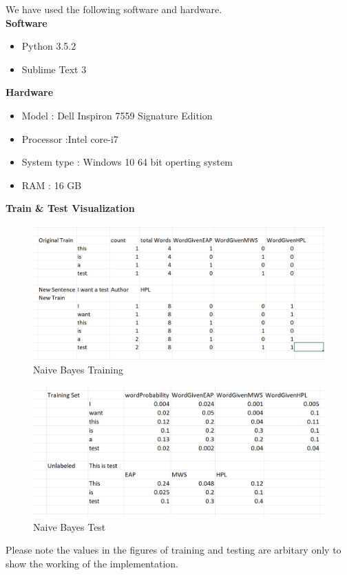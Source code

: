 \documentclass[fleqn,10pt]{SelfArx} %
\begin{document}
We have used the following software and hardware.\\
\textbf{Software}
\begin{itemize}[noitemsep]
	\item Python 3.5.2
	\item Sublime Text 3
\end{itemize}
\textbf{Hardware}
\begin{itemize}[noitemsep]
	\item Model : Dell Inspiron 7559 Signature Edition
	\item Processor :Intel core-i7
	\item System type : Windows 10 64 bit operting system
	\item RAM : 16 GB
\end{itemize}
\textbf{Train \& Test Visualization}\\
\begin{figure}[H]\centering
	\includegraphics[width=\linewidth]{TrainingNaiveBayes.PNG}
	\caption{Naive Bayes Training}
	\label{fig:Naive Bayes Training}
\end{figure}
\begin{figure}[H]\centering
	\includegraphics[width=\linewidth]{TestNaiveBayes.PNG}
	\caption{Naive Bayes Test}
	\label{fig:Naive Bayes Test}
\end{figure}
Please note the values in the figures of training and testing are arbitary only to show the working of the implementation.\\
\end{document}
